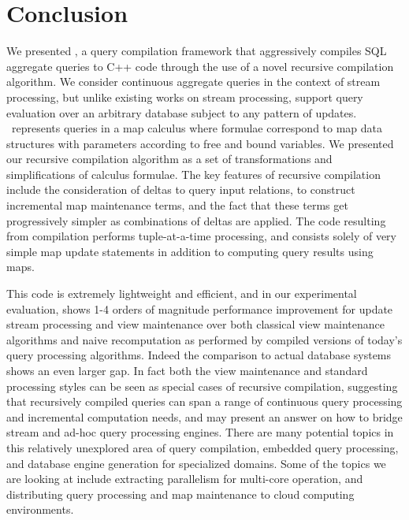 \section{Conclusion}
We presented \compiler, a query compilation framework that aggressively compiles
SQL aggregate queries to C++ code through the use of a novel recursive
compilation algorithm. We consider continuous aggregate queries in the context
of stream processing, but unlike existing works on stream processing, support
query evaluation over an arbitrary database subject to any pattern of
updates. \compiler\ represents queries in a map calculus where formulae
correspond to map data structures with parameters according to free and bound
variables. We presented our recursive compilation algorithm as a set of
transformations and simplifications of calculus formulae.
The key features of recursive compilation include the consideration of deltas to
query input relations, to construct incremental map maintenance terms, and the
fact that these terms get progressively simpler as combinations of deltas are
applied. The code resulting from compilation performs tuple-at-a-time
processing, and consists solely of very simple map update statements in addition
to computing query results using maps.

This code is extremely lightweight and efficient, and in our experimental
evaluation, shows 1-4 orders of magnitude performance improvement for update
stream processing and view maintenance over both classical view maintenance
algorithms and naive recomputation as performed by compiled versions of today's
query processing algorithms. Indeed the comparison to actual database systems
shows an even larger gap.  In fact both the view maintenance and standard
processing styles can be seen as special cases of recursive compilation,
suggesting that recursively compiled queries can span a range of continuous
query processing and incremental computation needs, and may present an answer on
how to bridge stream and ad-hoc query processing engines. There are many
potential topics in this relatively unexplored area of query compilation,
embedded query processing, and database engine generation for specialized
domains. Some of the topics we are looking at include extracting parallelism for
multi-core operation, and distributing query processing and map maintenance to
cloud computing environments.